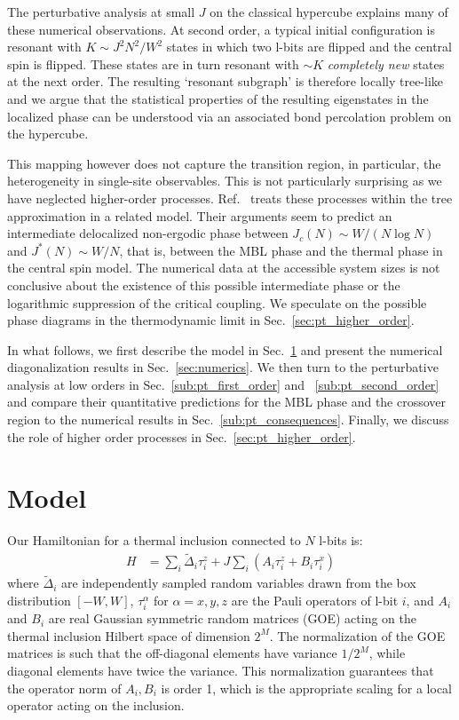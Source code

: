\documentclass[aps,pra,twocolumn,a4paper,showpacs,superscriptaddress,floatfix,10pt]{revtex4}
\begin{document}
The perturbative analysis at small $J$ on the classical hypercube explains many of these numerical observations.
At second order, a typical initial configuration is resonant with $K \sim J^2N^2/W^2$ states in which two l-bits are flipped and the central spin is flipped.
These states are in turn resonant with $\sim K$ \emph{completely new} states at the next order.
The resulting `resonant subgraph' is therefore locally tree-like and we argue that the statistical properties of the resulting eigenstates in the localized phase can be understood via an associated bond percolation problem on the hypercube.

This mapping however does not capture the transition region, in particular, the heterogeneity in single-site observables.
This is not particularly surprising as we have neglected higher-order processes.
Ref.~\cite{Altshuler:1997aa} treats these processes within the tree approximation in a related model.
Their arguments seem to predict an intermediate delocalized non-ergodic phase between $J_c(N) \sim W/(N\log N)$ and $J^*(N) \sim W/N$, that is, between the MBL phase and the thermal phase in the central spin model.
The numerical data at the accessible system sizes is not conclusive about the existence of this possible intermediate phase or the logarithmic suppression of the critical coupling.
We speculate on the possible phase diagrams in the thermodynamic limit in Sec.~\ref{sec:pt_higher_order}.

In what follows, we first describe the model in Sec.~\ref{sec:model} and present the numerical diagonalization results in Sec.~\ref{sec:numerics}.
We then turn to the perturbative analysis at low orders in Sec.~\ref{sub:pt_first_order} and ~\ref{sub:pt_second_order} and compare their quantitative predictions for the MBL phase and the crossover region to the numerical results in Sec.~\ref{sub:pt_consequences}.
Finally, we discuss the role of higher order processes in Sec.~\ref{sec:pt_higher_order}.


\section{Model}
\label{sec:model}

Our Hamiltonian for a thermal inclusion connected to $N$ l-bits is:
\begin{align}
H &= \sum_i \tilde{\Delta}_i \tau_i^z + J \sum_i (A_i  \tau^z_i + B_i  \tau^x_i)
\label{Eq:TheHamiltonian}
\end{align}
where $\tilde{\Delta}_i$ are independently sampled random variables drawn from the box distribution $[-W, W]$, $\tau^\alpha_i$ for $\alpha=x,y,z$ are the Pauli operators of l-bit $i$, and $A_i$ and $B_i$ are real Gaussian symmetric random matrices (GOE) acting on the thermal inclusion Hilbert space of dimension $2^M$.
The normalization of the GOE matrices is such that the off-diagonal elements have variance $1/2^M$, while diagonal elements have twice the variance. This normalization guarantees that the operator norm of $A_i, B_i$ is order 1, which is the appropriate scaling for a local operator acting on the inclusion.
\end{document}
